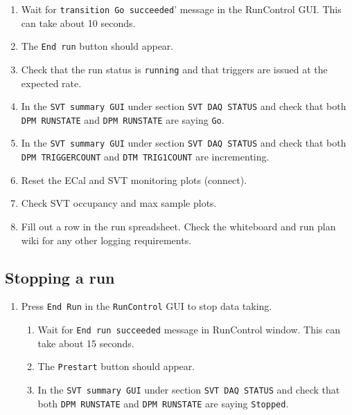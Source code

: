 \documentclass[12pt]{article}
\begin{document}
\begin{enumerate}
\begin{enumerate}

\item
Wait for \texttt{transition Go succeeded}' message in the RunControl GUI.\newline
This can take about 10 seconds.

\item
The \texttt{End run} button should appear.

\item
Check that the run status is \texttt{running} and that triggers are issued at the expected rate.


\item
In the \texttt{SVT summary GUI} under section \texttt{SVT DAQ STATUS} and check that both \texttt{DPM RUNSTATE}  and \texttt{DPM RUNSTATE}  are saying \texttt{Go}.

\item
In the \texttt{SVT summary GUI} under section \texttt{SVT DAQ STATUS} and check that both \texttt{DPM TRIGGERCOUNT} and   \texttt{DTM TRIG1COUNT}  are incrementing.


\item
Reset the ECal and SVT monitoring plots (connect). 

\item
Check SVT occupancy and max sample plots.

\item
Fill out a row in the run spreadsheet. Check the whiteboard and run plan wiki for any other logging requirements.

\end{enumerate}
\end{enumerate}

\subsection{Stopping a run}

\begin{enumerate}

\item
\label{item:stop}
Press \texttt{End Run} in the \texttt{RunControl}  GUI to stop data taking.

\begin{enumerate}

\item
Wait for \texttt{End run succeeded} message in RunControl window. \newline
This can take about 15 seconds.

\item
The \texttt{Prestart} button should appear.

\item
In the \texttt{SVT summary GUI} under section \texttt{SVT DAQ STATUS} and check that both \texttt{DPM RUNSTATE}  and \texttt{DPM RUNSTATE}  are saying \texttt{Stopped}.


\end{enumerate}
\end{enumerate}
\end{document}
